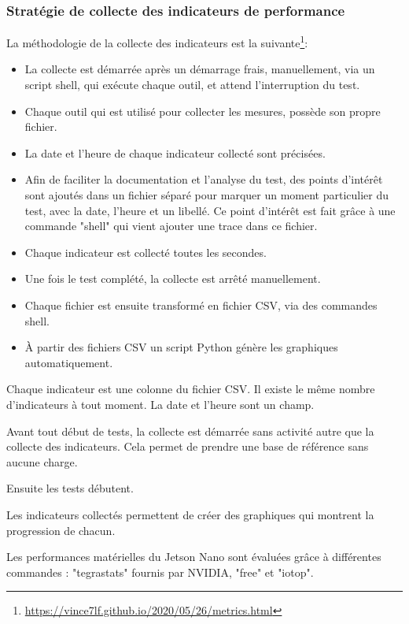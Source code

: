 \subsubsection{Stratégie de collecte des indicateurs de performance}
\par La méthodologie de la collecte des indicateurs est la suivante\footnote{\url{https://vince7lf.github.io/2020/05/26/metrics.html}}: 
\begin{itemize}    
    \item La collecte est démarrée après un démarrage frais, manuellement, via un script shell, qui exécute chaque outil, et attend l'interruption du test. 
    \item Chaque outil qui est utilisé pour collecter les mesures, possède son propre fichier.
    \item La date et l'heure de chaque indicateur collecté sont précisées.
    \item Afin de faciliter la documentation et l'analyse du test, des points d'intérêt sont ajoutés dans un fichier séparé pour marquer un moment particulier du test, avec la date, l'heure et un libellé. Ce point d'intérêt est fait grâce à une commande "shell" qui vient ajouter une trace dans ce fichier.
    \item Chaque indicateur est collecté toutes les secondes.  
    \item Une fois le test complété, la collecte est arrêté manuellement. 
    \item Chaque fichier est ensuite transformé en fichier CSV, via des commandes shell.
    \item À partir des fichiers CSV un script Python génère les graphiques automatiquement. 
\end{itemize}
\par Chaque indicateur est une colonne du fichier CSV. Il existe le même nombre d'indicateurs à tout moment. La date et l'heure sont un champ. 
\par Avant tout début de tests, la collecte est démarrée sans activité autre que la collecte des indicateurs. Cela permet de prendre une base de référence sans aucune charge.
\par Ensuite les tests débutent. 
\par Les indicateurs collectés permettent de créer des graphiques qui montrent la progression de chacun.
\par Les performances matérielles du Jetson Nano sont évaluées grâce à différentes commandes : "tegrastats" fournis par NVIDIA, "free" et "iotop".
